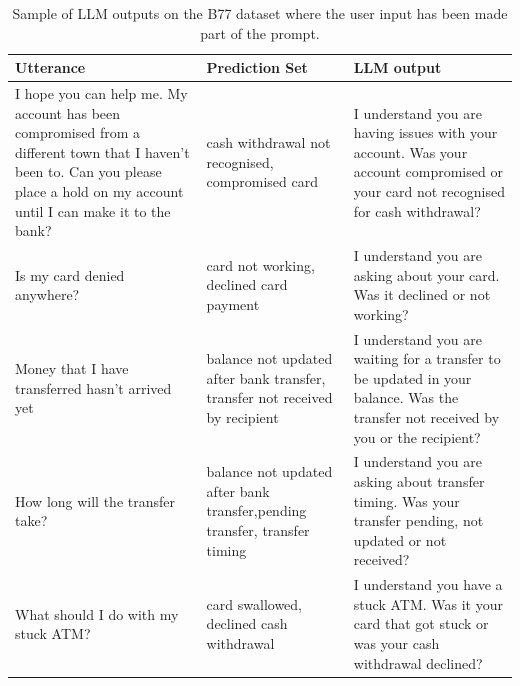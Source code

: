 \documentclass[11pt]{article}
\begin{document}
\begin{table}[h!]
 \centering
    \begin{tabular}{p{} p{} p{}}
    \toprule
    Utterance & Prediction Set & LLM output \\
    \midrule
I hope you can help me. My account has been compromised from a different town that I haven't been to. Can you please place a hold on my account until I can make it to the bank? & cash withdrawal not recognised, compromised card & I understand you are having issues with your account. Was your account compromised or your card not recognised for cash withdrawal?\\
Is my card denied anywhere? & card not working, declined card payment & I understand you are asking about your card. Was it declined or not working?\\
Money that I have transferred hasn't arrived yet & balance not updated after bank transfer, transfer not received by recipient & I understand you are waiting for a transfer to be updated in your balance. Was the transfer not received by you or the recipient?\\
How long will the transfer take? & balance not updated after bank transfer,pending transfer, transfer timing & I understand you are asking about transfer timing. Was your transfer pending, not updated or not received?\\
What should I do with my stuck ATM? & card swallowed, declined cash withdrawal & I understand you have a stuck ATM. Was it your card that got stuck or was your cash withdrawal declined?\\
\bottomrule
\end{tabular}
\caption{Sample of LLM outputs on the B77 dataset where the user input has been made part of the prompt.}
\label{}
\end{table}
\clearpage
\end{document}
